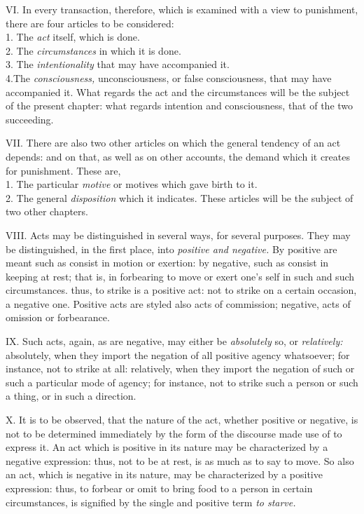 \documentclass[12pt]{report}
\begin{document}
VI. In every transaction, therefore, which is examined with a view to
punishment, there are four articles to be considered:\\
1. The \emph{act} itself, which is done.\\
2. The \emph{circumstances} in which it is done.\\
3. The \emph{intentionality} that may have accompanied it.\\
4.The \emph{consciousness,} unconsciousness, or false consciousness,
that may have accompanied it. What regards the act and the circumstances
will be the subject of the present chapter: what regards intention and
consciousness, that of the two succeeding.

VII. There are also two other articles on which the general tendency of
an act depends: and on that, as well as on other accounts, the demand
which it creates for punishment. These are,\\
1. The particular \emph{motive} or motives which gave birth to it.\\
2. The general \emph{disposition} which it indicates. These articles
will be the subject of two other chapters.

VIII. Acts may be distinguished in several ways, for several purposes.
They may be distinguished, in the first place, into \emph{positive and
negative.} By positive are meant such as consist in motion or exertion:
by negative, such as consist in keeping at rest; that is, in forbearing
to move or exert one's self in such and such circumstances. thus, to
strike is a positive act: not to strike on a certain occasion, a
negative one. Positive acts are styled also acts of commission;
negative, acts of omission or forbearance.

IX. Such acts, again, as are negative, may either be \emph{absolutely}
so, or \emph{relatively:} absolutely, when they import the negation of
all positive agency whatsoever; for instance, not to strike at all:
relatively, when they import the negation of such or such a particular
mode of agency; for instance, not to strike such a person or such a
thing, or in such a direction.

X. It is to be observed, that the nature of the act, whether positive or
negative, is not to be determined immediately by the form of the
discourse made use of to express it. An act which is positive in its
nature may be characterized by a negative expression: thus, not to be at
rest, is as much as to say to move. So also an act, which is negative in
its nature, may be characterized by a positive expression: thus, to
forbear or omit to bring food to a person in certain circumstances, is
signified by the single and positive term \emph{to starve.}
\end{document}
